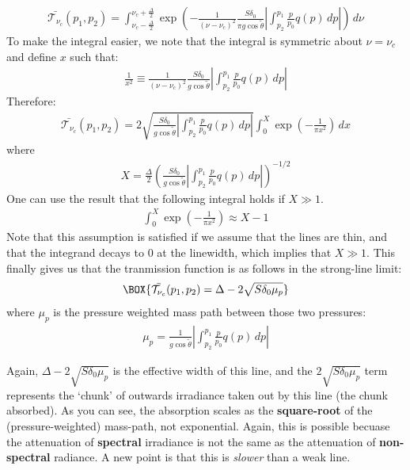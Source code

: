 \begin{align*}
    \bar{\mathcal{T}_{\nu_c}}(p_1,p_2)
    =
    \int_{\nu_c-\frac{\Delta}{2}}^{\nu_c+\frac{\Delta}{2}} \exp\left(
        -\frac{1}{(\nu-\nu_c)^2}
        \frac{S\delta_0}{\pi g \cos \tilde{\theta}}
        \left|
            \int_{p_2}^{p_1}\frac{p}{p_0} q(p)\,dp
        \right|
    \right)\,d\nu
\end{align*}
To make the integral easier, we note that the integral is symmetric about $\nu=\nu_c$ and define $x$ such that:
\begin{align*}
    \frac{1}{x^2}\equiv\frac{1}{(\nu-\nu_c)^2}
        \frac{S\delta_0}{g \cos \tilde{\theta}}
        \left|
            \int_{p_2}^{p_1}\frac{p}{p_0} q(p)\,dp
        \right|
\end{align*}
Therefore:
\begin{align*}
    \bar{\mathcal{T}_{\nu_c}}(p_1,p_2)
    =2
    \sqrt{\frac{S\delta_0}{g \cos \tilde{\theta}}
        \left|
            \int_{p_2}^{p_1}\frac{p}{p_0} q(p)\,dp
        \right|}
    \int_{0}^{X} \exp\left(
        -\frac{1}{\pi x^2}
    \right)\,dx
\end{align*}
where
\begin{align*}
    X=\frac{\Delta}{2}\left(\frac{S\delta_0}{g \cos \tilde{\theta}}
        \left|
            \int_{p_2}^{p_1}\frac{p}{p_0} q(p)\,dp
        \right|\right)^{-1/2}
\end{align*}
One can use the result that the following integral holds if $X\gg 1$. 
\begin{align*}
    \int_{0}^{X}\exp\left( -\frac{1}{\pi x^2} \right)\approx X-1
\end{align*}
Note that this assumption is satisfied if we assume that the lines are thin, and that the integrand decays to $0$ at the linewidth, which implies that $X\gg 1$. This finally gives us that the tranmission function is as follows in the strong-line limit:
\begin{align}
    \BOX{
        \bar{\mathcal{T}_{\nu_c}}(p_1,p_2)
        =
        \Delta
        -
        2\sqrt{S\delta_0 \mu_p}
    }
\end{align}
where $\mu_p$ is the pressure weighted mass path between those two pressures:
\begin{align*}
    \mu_p=\frac{1}{g\cos\tilde{\theta}}\left|
            \int_{p_2}^{p_1}\frac{p}{p_0} q(p)\,dp
        \right|
\end{align*}

Again, $\Delta-2\sqrt{S\delta_0 \mu_p}$ is the effective width of this line, and the $2\sqrt{S\delta_0 \mu_p}$ term represents the `chunk' of outwards irradiance taken out by this line (the chunk absorbed). As you can see, the absorption scales as the \textbf{square-root} of the (pressure-weighted) mass-path, not exponential. Again, this is possible becuase the attenuation of \textbf{spectral} irradiance is not the same as the attenuation of \textbf{non-spectral} radiance. A new point is that this is \textit{slower} than a weak line.


